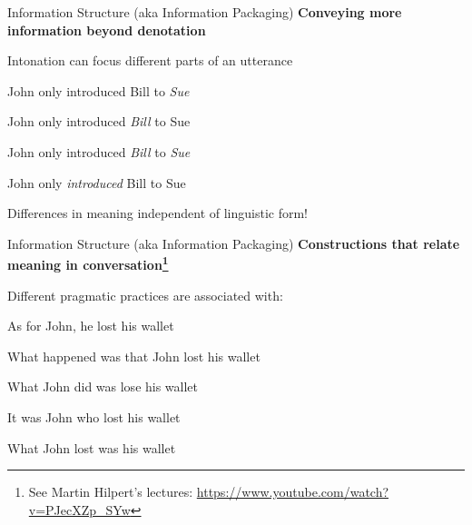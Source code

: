 \documentclass[aspectratio=169,cramped]{beamer}
\let\tempone\itemize
\let\temptwo\enditemize
\renewenvironment{itemize}{\tempone\addtolength{\itemsep}{-0\baselineskip}\addtolength{\parskip}{-0.2\baselineskip}}{\temptwo}
\newcommand{\ex}[1]{{\color{teal} #1}}
\begin{document}
\begin{frame}{Information Structure (aka Information Packaging)}
	\textbf{Conveying more information beyond denotation}
  \begin{itemize}
  \item Intonation can focus different parts of an utterance
    \begin{itemize}
    \item \ex{John only introduced Bill to \emph{Sue}}
    \item \ex{John only introduced \emph{Bill} to Sue}
    \item \ex{John only introduced \emph{Bill} to \emph{Sue}}
    \item \ex{John only \emph{introduced} Bill to Sue}
    \end{itemize}
  \item Differences in meaning independent of linguistic form!
  \end{itemize}
\end{frame}

\begin{frame}{Information Structure (aka Information Packaging)}
	\textbf{Constructions that relate meaning in conversation\footnote{See Martin Hilpert's lectures:
    \protect\url{https://www.youtube.com/watch?v=PJecXZp_SYw}}}
\begin{itemize}
  \item Different pragmatic practices are associated with:
    \begin{itemize}
    \item \ex{As for John, he lost his wallet}
    \item \ex{What happened was that John lost his wallet}
    \item \ex{What John did was lose his wallet}
    \item \ex{It was John who lost his wallet}
    \item \ex{What John lost was his wallet}
    \end{itemize}
  \end{itemize}
\end{frame}
\end{document}
